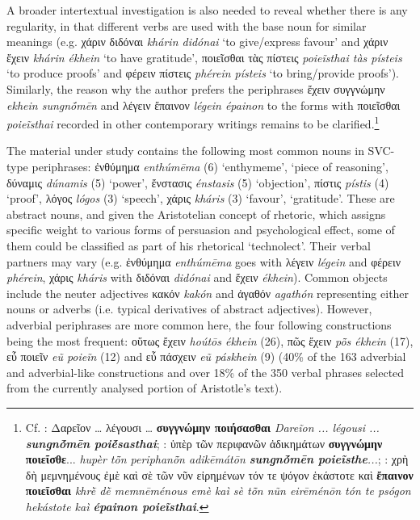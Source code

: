 \documentclass[output=paper,colorlinks,citecolor=brown]{langscibook}
\begin{document}
A broader intertextual investigation is also needed to reveal whether there is any regularity, in that different verbs are used with the base noun for similar meanings (e.g. χάριν διδόναι \textit{khárin didónai} ‘to give/express favour' and χάριν ἔχειν \textit{khárin ékhein} ‘to have gratitude', ποιεῖσθαι τὰς πίστεις \textit{poieĩsthai tàs písteis} ‘to produce proofs' and φέρειν πίστεις \textit{phérein písteis} ‘to bring/provide proofs'). Similarly, the reason why the author prefers the periphrases ἔχειν συγγνώμην \textit{ekhein sungnṓmēn} and λέγειν ἔπαινον \textit{légein épainon} to the forms with ποιεῖσθαι \textit{poieĩsthai} recorded in other contemporary writings remains to be clarified.\footnote{Cf. : Δαρεῖον … λέγουσι … \textbf{συγγνώμην ποιήσασθαι} \textit{Dareĩon ... légousi ... \textbf{sungnṓmēn poiḗsasthai}}; : ὑπὲρ τῶν περιφανῶν ἀδικημάτων \textbf{συγγνώμην ποιεῖσθε}... \textit{hupèr tō̃n periphanō̃n adikēmátōn \textbf{sungnṓmēn poieĩsthe}...}; : χρὴ δὴ μεμνημένους ἐμὲ καὶ σὲ τῶν νῦν εἰρημένων τόν τε ψόγον ἑκάστοτε καὶ \textbf{ἔπαινον ποιεῖσθαι} \textit{khrḕ dḕ memnēménous emè kaì sè tō̃n nũn eirēménōn tón te psógon hekástote kaì \textbf{épainon poieĩsthai}}. } 

The material under study contains the following most common nouns in SVC-type periphrases: ἐνθύμημα \textit{enthúmēma} (6) ‘enthymeme', ‘piece of reasoning', δύναμις \textit{dúnamis} (5) ‘power', ἔνστασις \textit{énstasis} (5) ‘objection', πίστις \textit{pístis} (4) ‘proof', λόγος \textit{lógos} (3) ‘speech', χάρις \textit{kháris} (3) ‘favour', ‘gratitude'. These are abstract nouns, and given the Aristotelian concept of rhetoric, which assigns specific weight to various forms of persuasion and psychological effect, some of them could be classified as part of his rhetorical ‘technolect’. Their verbal partners may vary (e.g. ἐνθύμημα \textit{enthúmēma} goes with λέγειν \textit{légein} and φέρειν \textit{phérein}, χάρις \textit{kháris} with διδόναι \textit{didónai} and ἔχειν \textit{ékhein}). Common objects include the neuter adjectives κακόν \textit{kakón} and ἀγαθόν \textit{agathón} representing either nouns or adverbs (i.e. typical derivatives of abstract adjectives). However, adverbial periphrases are more common here, the four following constructions being the most frequent: οὕτως ἔχειν \textit{hoútōs ékhein} (26), πῶς ἔχειν \textit{pō̃s ékhein} (17), εὖ ποιεῖν \textit{eũ poieĩn} (12) and εὖ πάσχειν \textit{eũ páskhein} (9) (40\% of the 163 adverbial and adverbial-like constructions and over 18\% of the 350 verbal phrases selected from the currently analysed portion of Aristotle’s text).
\end{document}
